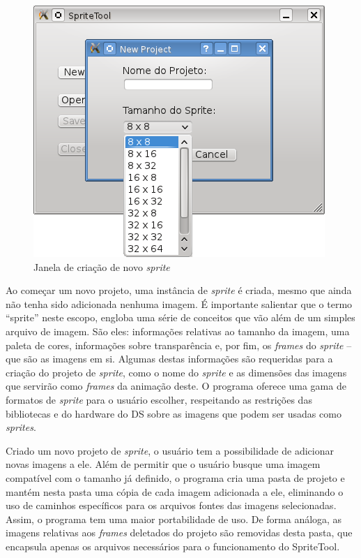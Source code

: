 \documentclass[brazil]{abnt}
\begin{document}
\begin{figure}[h!]
\centering
\includegraphics{imgs/spritetool1.png}
\caption{Janela de criação de novo \textit{sprite}}
\end{figure}

Ao começar um novo projeto, uma instância de \textit{sprite} é criada, mesmo que ainda não tenha sido adicionada nenhuma imagem. É importante salientar que o termo ``sprite'' neste escopo, engloba uma série de conceitos que vão além de um simples arquivo de imagem. São eles: informações relativas ao tamanho da imagem, uma paleta de cores, informações sobre transparência e, por fim, os \textit{frames} do \textit{sprite} – que são as imagens em si.
Algumas destas informações são requeridas para a criação do projeto de \textit{sprite}, como o nome do \textit{sprite} e as dimensões das imagens que servirão como \textit{frames} da animação deste. O programa oferece uma gama de formatos de \textit{sprite} para o usuário escolher, respeitando as restrições das bibliotecas e do hardware do DS sobre as imagens que podem ser usadas como \textit{sprites}.

Criado um novo projeto de \textit{sprite}, o usuário tem a possibilidade de adicionar novas imagens a ele. Além de permitir que o usuário busque uma imagem compatível com o tamanho já definido, o programa cria uma pasta de projeto e mantém nesta pasta uma cópia de cada imagem adicionada a ele, eliminando o uso de caminhos específicos para os arquivos fontes das imagens selecionadas. Assim, o programa tem uma maior portabilidade de uso. De forma análoga, as imagens relativas aos \textit{frames} deletados do projeto são removidas desta pasta, que encapsula apenas os arquivos necessários para o funcionamento do SpriteTool.
\end{document}
